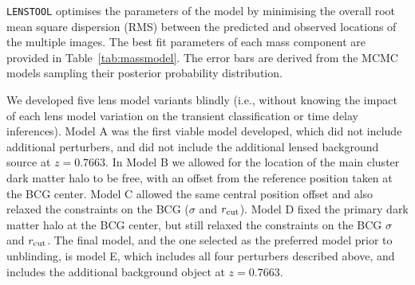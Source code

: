 \documentclass[12pt]{article}
\def\lenstool{{\tt LENSTOOL}\xspace}
\begin{document}
\lenstool optimises the parameters of the model by minimising the overall root mean square dispersion (RMS) between the predicted and observed locations of the multiple images. The best fit parameters of each mass component are provided in Table~\ref{tab:massmodel}. The error bars are derived from the MCMC models sampling their posterior probability distribution. 

We developed five lens model variants blindly (i.e., without knowing the impact of each lens model variation on the transient classification or time delay inferences). Model A was the first viable model developed, which did not include additional perturbers, and did not include the additional lensed background source at $z=0.7663$.   In Model B we allowed for the location of the main cluster dark matter halo to be free, with an offset from the reference position taken at the BCG center.  Model C allowed the same central position offset and also relaxed the constraints on the BCG ($\sigma$ and $r_{\rm cut}$).  Model D fixed the primary dark matter halo at the BCG center, but still relaxed the constraints on the BCG $\sigma$ and $r_{\rm cut}$.
The final model, and the one selected as the preferred model prior to unblinding, is model E, which includes all four perturbers described above, and includes the additional background object at $z=0.7663$.
\end{document}
